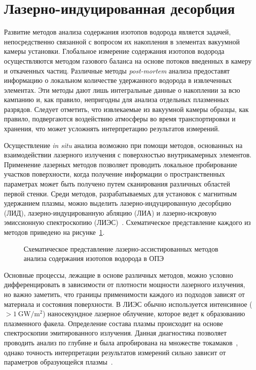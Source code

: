 \section{Лазерно-индуцированная десорбция}\label{sec:ch1/sec6}

Развитие методов анализа содержания изотопов водорода является задачей, непосредственно связанной с вопросом их накопления в элементах вакуумной камеры установки. Глобальное измерение содержания изотопов водорода осуществляются методом газового баланса на основе потоков введенных в камеру и откаченных частиц. Различные методы \textit{post-mortem} анализа предоставят информацию о локальном количестве удержанного водорода в извлеченных элементах. Эти методы дают лишь интегральные данные о накоплении за всю кампанию и, как правило, непригодны для анализа отдельных плазменных разрядов. Следует отметить, что извлекаемые из вакуумной камеры образцы, как правило, подвергаются воздействию атмосферы во время транспортировки и хранения, что может усложнять интерпретацию результатов измерений.

Осуществление \textit{in situ} анализа возможно при помощи методов, основанных на взаимодействии лазерного излучения с поверхностью внутрикамерных элементов. Применение лазерных методов позволяет проводить локальное пробирование участков поверхности, когда получение информации о пространственных параметрах может быть получено путем сканирования различных областей первой стенки. Среди методов, разрабатываемых для установок с магнитным удержанием плазмы, можно выделить лазерно-индуцированную десорбцию (ЛИД), лазерно-индуцированную абляцию (ЛИА) и лазерно-искровую эмиссионную спектроскопию (ЛИЭС)~\cite{Philipps2013,Mukhin2016}. Схематическое представление каждого из методов приведено на рисунке~\cref{fig:ch1/laser_methods}.

\begin{figure}[ht]
    \caption{Схематическое представление лазерно-ассистированных методов анализа содержания изотопов водорода в ОПЭ}\label{fig:ch1/laser_methods}
\end{figure}

Основные процессы, лежащие в основе различных методов, можно условно дифференцировать в зависимости от плотности мощности лазерного излучения, но важно заметить, что границы применимости каждого из подходов зависят от материала и состояния поверхности. В ЛИЭС обычно используется интенсивное (\( >\SI{1}{\giga\watt\per\meter\squared} \)) наносекундное лазерное облучение, которое ведет к образованию плазменного факела. Определение состава плазмы происходит на основе спектроскопии эмитированного излучения. Данная диагностика позволяет проводить анализ по глубине и была апробирована на множестве токамаков~\cite{Xiao2015,Semerok2016,Imran2023,Favre2024}, однако точность интерпретации результатов измерений сильно зависит от параметров образующейся плазмы~\cite{Marenkov2021}. 

